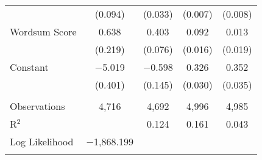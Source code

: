 \begin{table}[!htbp]
\begin{tabular}{@{\extracolsep{0pt}}lcccc}
  & (0.094) & (0.033) & (0.007) & (0.008) \\ 
  Wordsum Score & 0.638 & 0.403 & 0.092 & 0.013 \\ 
  & (0.219) & (0.076) & (0.016) & (0.019) \\ 
  Constant & $-$5.019 & $-$0.598 & 0.326 & 0.352 \\ 
  & (0.401) & (0.145) & (0.030) & (0.035) \\ 
 \hline \\[-1.8ex] 
Observations & 4,716 & 4,692 & 4,996 & 4,985 \\ 
R$^{2}$ &  & 0.124 & 0.161 & 0.043 \\ 
Log Likelihood & $-$1,868.199 &  &  &  \\ 
\hline 
\hline \\[-1.8ex] 
\end{tabular} 
\end{table} 
